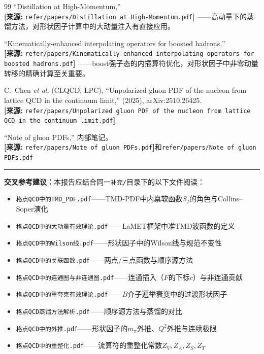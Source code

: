 \documentclass[12pt,a4paper]{ctexart}
\theoremstyle{definition}
\begin{document}
\begin{thebibliography}{99}
``Distillation at High-Momentum,''
\\\textbf{[来源:} \texttt{refer/papers/Distillation at High-Momentum.pdf}\textbf{]}
——高动量下的蒸馏方法，对形状因子计算中的大动量注入有直接应用。

``Kinematically-enhanced interpolating operators for boosted hadrons,''
\\\textbf{[来源:} \texttt{refer/papers/Kinematically-enhanced interpolating operators for boosted hadrons.pdf}\textbf{]}
——boost强子态的内插算符优化，对形状因子中非零动量转移的精确计算至关重要。

C.~Chen \textit{et al.} (CLQCD, LPC),
``Unpolarized gluon PDF of the nucleon from lattice QCD in the continuum limit,''
(2025), arXiv:2510.26425.
\\\textbf{[来源:} \texttt{refer/papers/Unpolarized gluon PDF of the nucleon from lattice QCD in the continuum limit.pdf}\textbf{]}

``Note of gluon PDFs,'' 内部笔记。
\\\textbf{[来源:} \texttt{refer/papers/Note of gluon PDFs.pdf}\textbf{]}和\texttt{refer/papers/Note of gluon PDFs.pdf}

\end{thebibliography}

\vspace{0.5cm}
\noindent\rule{\textwidth}{0.5pt}
\small
\textbf{交叉参考建议：}本报告应结合同一\texttt{补充/}目录下的以下文件阅读：
\begin{itemize}[nosep]
    \item \texttt{格点QCD中的TMD\_PDF.pdf}——TMD-PDF中内禀软函数$S_I$的角色与Collins--Soper演化
    \item \texttt{格点QCD中的大动量有效理论.pdf}——LaMET框架中准TMD波函数的定义
    \item \texttt{格点QCD中的Wilson线.pdf}——形状因子中的Wilson线与规范不变性
    \item \texttt{格点QCD中的关联函数.pdf}——两点/三点函数与顺序源方法
    \item \texttt{格点QCD中的连通图与非连通图.pdf}——连通插入（$F$的下标$c$）与非连通贡献
    \item \texttt{格点QCD中的重夸克有效理论.pdf}——$B$介子遍举衰变中的过渡形状因子
    \item \texttt{格点QCD蒸馏方法解析.pdf}——顺序源方法与蒸馏的对比
    \item \texttt{格点QCD中的外推.pdf}——形状因子的$m_\pi$外推、$Q^2$外推与连续极限
    \item \texttt{格点QCD中的重整化.pdf}——流算符的重整化常数$Z_V, Z_A, Z_S, Z_T$
\end{itemize}
\end{document}
